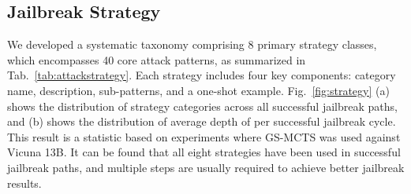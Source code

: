 \documentclass[11pt]{article}
\def\attackmethod{GS-MCTS}
\begin{document}
\subsection{Jailbreak Strategy} \label{app:Strategy}
We developed a systematic taxonomy comprising 8 primary strategy classes, which encompasses 40 core attack patterns, as summarized in Tab.~\ref{tab:attackstrategy}. Each strategy includes four key components: category name, description, sub-patterns, and a one-shot example. Fig.~\ref{fig:strategy} (a) shows the distribution of strategy categories across all successful jailbreak paths, and (b) shows the distribution of average depth of  per successful jailbreak cycle. This result is a statistic based on experiments where {\attackmethod} was used against Vicuna 13B. It can be found that all eight strategies have been used in successful jailbreak paths, and multiple steps are usually required to achieve better jailbreak results.
\end{document}
